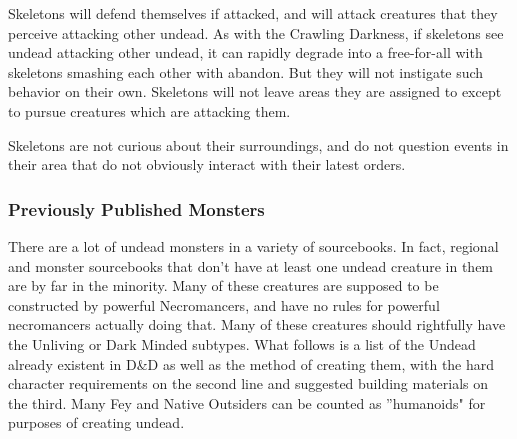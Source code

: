 Skeletons will defend themselves if attacked, and will attack creatures that they perceive attacking other undead. As with the Crawling Darkness, if skeletons see undead attacking other undead, it can rapidly degrade into a free-for-all with skeletons smashing each other with abandon. But they will not instigate such behavior on their own. Skeletons will not leave areas they are assigned to except to pursue creatures which are attacking them.

Skeletons are not curious about their surroundings, and do not question events in their area that do not obviously interact with their latest orders.

\subsubsection{Previously Published Monsters}

There are a lot of undead monsters in a variety of sourcebooks. In fact, regional and monster sourcebooks that don't have at least one undead creature in them are by far in the minority. Many of these creatures are supposed to be constructed by powerful Necromancers, and have no rules for powerful necromancers actually doing that. Many of these creatures should rightfully have the Unliving or Dark Minded subtypes. What follows is a list of the Undead already existent in D\&D as well as the method of creating them, with the hard character requirements on the second line and suggested building materials on the third. Many Fey and Native Outsiders can be counted as ''humanoids" for purposes of creating undead.

